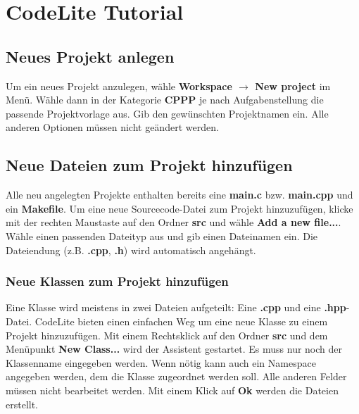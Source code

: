 \def\additionalOptionsForClass{nochapname,bigchapter}




\cppSetHeaderAndMakeTitle

\section{CodeLite Tutorial}

\subsection{Neues Projekt anlegen}
Um ein neues Projekt anzulegen, wähle \textbf{Workspace $\rightarrow$ New project} im Menü. Wähle dann in der Kategorie \textbf{CPPP} je nach Aufgabenstellung die passende Projektvorlage aus.
Gib den gewünschten Projektnamen ein. Alle anderen Optionen müssen nicht geändert werden.

\subsection{Neue Dateien zum Projekt hinzufügen}
Alle neu angelegten Projekte enthalten bereits eine \textbf{main.c} bzw. \textbf{main.cpp} und ein \textbf{Makefile}.
Um eine neue Sourcecode-Datei zum Projekt hinzuzufügen, klicke mit der rechten Maustaste auf den Ordner \textbf{src} und wähle \textbf{Add a new file...}.
Wähle einen passenden Dateityp aus und gib einen Dateinamen ein. Die Dateiendung (z.B. \textbf{.cpp}, \textbf{.h}) wird automatisch angehängt.

\subsubsection{Neue Klassen zum Projekt hinzufügen}
Eine Klasse wird meistens in zwei Dateien aufgeteilt: Eine \textbf{.cpp} und eine \textbf{.hpp}-Datei. CodeLite bieten einen einfachen Weg um eine neue Klasse zu einem Projekt hinzuzufügen. Mit einem Rechtsklick auf den Ordner \textbf{src} und dem Menüpunkt \textbf{New Class...} wird der Assistent gestartet. Es muss nur noch der Klassenname eingegeben werden. Wenn nötig kann auch ein Namespace angegeben werden, dem die Klasse zugeordnet werden soll. Alle anderen Felder müssen nicht bearbeitet werden. Mit einem Klick auf \textbf{Ok} werden die Dateien erstellt.


